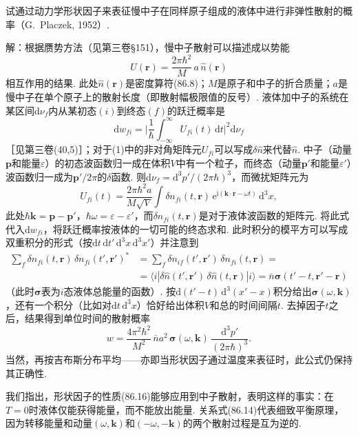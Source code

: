 \begin{xiti}

{\sloppy 试通过动力学形状因子来表征慢中子在同样原子组成的液体中进行非弹性散射的概率\allowbreak（G.~Placzek, 1952）.\par}

{\heiti 解：}根据赝势方法（见第三卷§151），慢中子散射可以描述成以势能
\begin{equation}\tag{1}
U(\bm{r})=\frac{2\pi\hbar^{2}}{M}\,a\,\hat{n}(\bm{r})
\end{equation}
相互作用的结果. 此处$\hat{n}(\bm{r})$是密度算符(86.8)；$M$是原子和中子的折合质量；$a$是慢中子在单个原子上的散射长度（即散射幅极限值的反号）. 液体加中子的系统在某区间$\mathrm{d}\nu_{f}$内从某初态$(i)$到终态$(f)$的跃迁概率是
\begin{equation}\tag{2}
\mathrm{d}w_{fi}=\biggl|\frac{1}{\hbar}\int_{-\infty}^{\infty}U_{fi}(t)\,\mathrm{d}t\biggr|^{2}\mathrm{d}\nu_{f}
\end{equation}
［见第三卷(40,5)］；对于(1)中的非对角矩阵元$U_{fi}$可以写成$\delta\hat{n}$来代替$\hat{n}$. 中子（动量$\bm{p}$和能量$\varepsilon$）的初态波函数归一成在体积$V$中有一个粒子，而终态（动量$\bm{p}'$和能量$\varepsilon'$）波函数归一成为$\bm{p}'/2\pi$的$\delta$函数. 则$\mathrm{d}\nu_{f}=\mathrm{d}^{3}p'/(2\pi\hbar)^{3}$，而微扰矩阵元为
\begin{equation*}
U_{fi}(t)=\frac{2\pi\hbar^{2}a}{M\sqrt{V}}\int\delta n_{fi}(t,\bm{r})\,\mathrm{e}^{\mathrm{i}(\bm{k}\cdot\bm{r}-\omega t)}\,\mathrm{d}^{3}x,
\end{equation*}
此处$\hbar\bm{k}=\bm{p}-\bm{p}'$，$\hbar\omega=\varepsilon-\varepsilon'$，而$\delta n_{fi}(t,\bm{r})$是对于液体波函数的矩阵元. 将此式代入$\mathrm{d}w_{fi}$，将跃迁概率按液体的一切可能的终态求和. 此时积分的模平方可以写成双重积分的形式（按$\mathrm{d}t\,\mathrm{d}t'\,\mathrm{d}^{3}x\,\mathrm{d}^{3}x'$）并注意到
\begin{equation*}
\begin{aligned}
\sum_{f}\delta n_{fi}(t,\bm{r})\,\delta n_{fi}(t',\bm{r}')^{*}&=\sum_{f}\delta n_{if}(t',\bm{r}')\,\delta n_{fi}(t,\bm{r})=\\
&=\bigl\langle i|\delta\hat{n}(t',\bm{r}')\,\delta\hat{n}(t,\bm{r})|i\bigr\rangle=\bar{n}\bm{\sigma}(t'-t,\bm{r}'-\bm{r})
\end{aligned}
\end{equation*}
（此时$\bm{\sigma}$表为$i$态液体总能量的函数）. 按$\mathrm{d}(t'-t)\,\mathrm{d}^{3}(x'-x)$积分给出$\bm{\sigma}(\omega,\bm{k})$，还有一个积分（比如对$\mathrm{d}t\,\mathrm{d}^{3}x$）恰好给出体积$V$和总的时间间隔$t$. 去掉因子$t$之后，结果得到单位时间的散射概率
\begin{equation}\tag{3}
w=\frac{4\pi^{2}\hbar^{2}}{M^{2}}\,\bar{n}a^{2}\,\bm{\sigma}(\omega,\bm{k})\,\frac{\mathrm{d}^{3}p'}{(2\pi\hbar)^{3}}.
\end{equation}
当然，再按吉布斯分布平均——亦即当形状因子通过温度来表征时，此公式仍保持其正确性.

我们指出，形状因子的性质(86.16)能够应用到中子散射，表明这样的事实：在$T=0$时液体仅能获得能量，而不能放出能量. 关系式(86.14)代表细致平衡原理，因为转移能量和动量$(\omega,\bm{k})$和$(-\omega,-\bm{k})$的两个散射过程是互为逆的.

\end{xiti}

